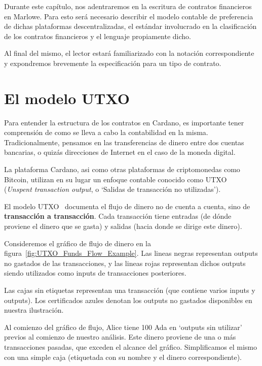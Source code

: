 \documentclass[12pt]{book}
\begin{document}
Durante este capítulo, nos adentraremos en la escritura de contratos financieros en Marlowe. Para esto será necesario describir el modelo contable de preferencia de dichas plataformas descentralizadas, el estándar involucrado en la clasificación de los contratos financieros y el lenguaje propiamente dicho.

Al final del mismo, el lector estará familiarizado con la notación correspondiente y expondremos brevemente la especificación para un tipo de contrato.

\section{El modelo UTXO} %

Para entender la estructura de los contratos en Cardano, es importante tener comprensión de como se lleva a cabo la contabilidad en la misma.
Tradicionalmente, pensamos en las transferencias de dinero entre dos cuentas bancarias, o quizás direcciones de Internet en el caso de la moneda digital.

La plataforma Cardano, asi como otras plataformas de criptomonedas como Bitcoin, utilizan en su lugar un enfoque contable conocido como UTXO~\cite{cardano_utxo_ledger} (\textit{Unspent transaction output}, o `Salidas de transacción no utilizadas').

El modelo UTXO~\cite{Translating_and_Unifying_UTXO-based, UTxO_Lars} documenta el flujo de dinero no de cuenta a cuenta, sino de \textbf{transacción a transacción}. Cada transacción tiene entradas (de dónde proviene el dinero que se gasta) y salidas (hacia donde se dirige este dinero).

Consideremos el gráfico de flujo de dinero en la figura~\ref{fig:UTXO_Funds_Flow_Example}. Las lineas negras representan outputs no gastados de las transacciones, y las lineas rojas representan dichos outputs siendo utilizados como inputs de transacciones posteriores.

Las cajas sin etiquetas representan una transacción (que contiene varios inputs y outputs). Los certificados azules denotan los outputs no gastados disponibles en nuestra ilustración.

Al comienzo del gráfico de flujo, Alice tiene 100 Ada en `outputs sin utilizar' previos al comienzo de nuestro análisis. Este dinero proviene de una o más transacciones pasadas, que exceden el alcance del gráfico. Simplificamos el mismo con una simple caja (etiquetada con su nombre y el dinero correspondiente).
\end{document}
